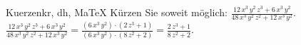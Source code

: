 \begin{MAufgabe}{Kuerzen}{kr, dh, MaTeX}
K\"urzen Sie soweit m\"oglich: $\frac{12\, x^3\, y^2\, z^3 + 6\, x^3\, y^2}{48\, x^3\, y^2\, z^2 + 12\, x^3\, y^2}$.\\ 
\ifLsg\MLoesung
\quad $\frac{12\, x^3\, y^2\, z^3 + 6\, x^3\, y^2}{48\, x^3\, y^2\, z^2 + 12\, x^3\, y^2}=\frac{(6\, x^3\, y^2)\cdot(2\, z^3 + 1)}{(6\, x^3\, y^2)\cdot(8\, z^2 + 2)}=\frac{2\, z^3 + 1}{8\, z^2 + 2}$.\else\relax\fi
 \end{MAufgabe}